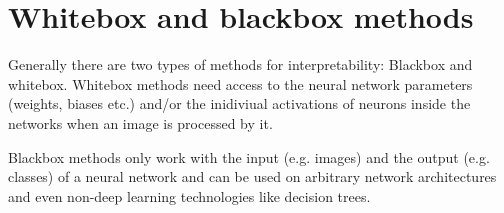 \section{Whitebox and blackbox methods}
Generally there are two types of methods for interpretability: Blackbox and whitebox. Whitebox methods need access to the neural network parameters (weights, biases etc.) and/or the inidiviual activations of neurons inside the networks when an image is processed by it.

Blackbox methods only work with the input (e.g. images) and the output (e.g. classes) of a neural network and can be used on arbitrary network architectures and even non-deep learning technologies like decision trees.
